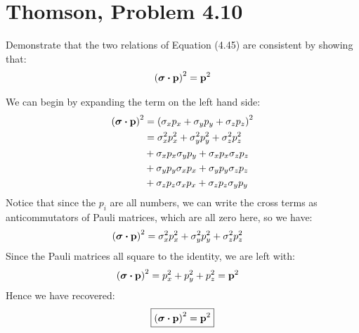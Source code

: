 \documentclass[12pt]{article}
\begin{document}
\section{Thomson, Problem 4.10}
\begin{problem}
  Demonstrate that the two relations of Equation (4.45) are consistent by showing that:
  \begin{align*}
    {(\bm{\sigma}\vdot\vb{p})}^2=\vb{p}^2
  \end{align*}
\end{problem}
We can begin by expanding the term on the left hand side:
\begin{align*}
  {(\bm{\sigma}\vdot\vb{p})}^2&=
  {(\sigma_x p_x+\sigma_y p_y+\sigma_z p_z)}^2\\
  &=\sigma_x^2p_x^2+\sigma_y^2p_y^2+\sigma_z^2p_z^2\\
  &+\sigma_x p_x\sigma_y p_y+\sigma_x p_x\sigma_z p_z\\
  &+\sigma_y p_y\sigma_x p_x+\sigma_y p_y\sigma_z p_z\\
  &+\sigma_z p_z\sigma_x p_x+\sigma_z p_z\sigma_y p_y
\end{align*}
Notice that since the $p_i$ are all numbers, we can write the cross terms as anticommutators of Pauli matrices, which are all zero here, so we have:
\begin{align*}
  {(\bm{\sigma}\vdot\vb{p})}^2&=\sigma_x^2p_x^2+\sigma_y^2p_y^2+\sigma_z^2p_z^2
\end{align*}
Since the Pauli matrices all square to the identity, we are left with:
\begin{align*}
  {(\bm{\sigma}\vdot\vb{p})}^2&=p_x^2+p_y^2+p_z^2=\vb{p}^2
\end{align*}
Hence we have recovered:
\begin{equation}
  \label{eq:p4}
  \boxed{{(\bm{\sigma}\vdot\vb{p})}^2=\vb{p}^2}
\end{equation}
\newpage
\end{document}
